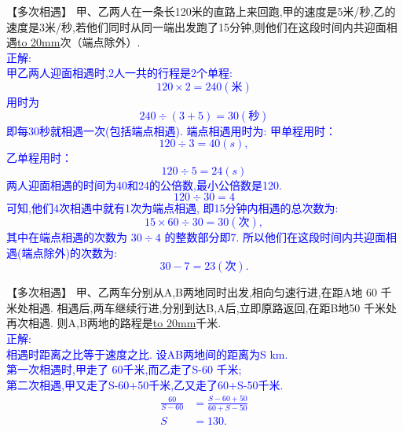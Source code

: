\item {
    【多次相遇】
    甲、乙两人在一条长120米的直路上来回跑,甲的速度是5米/秒,乙的速度是3米/秒,若他们同时从同一端出发跑了15分钟,则他们在这段时间内共迎面相遇\underline{\hbox to 20mm{}}次（端点除外）. 
    \ifshowSolution 
        \fangsong{}\textcolor{blue}{
            \\正解: \\
                甲乙两人迎面相遇时,2人一共的行程是2个单程:
                $$120\times 2=240(米)$$
                用时为
                $$240\div (3+5)=30(秒)$$
                即每30秒就相遇一次(包括端点相遇).
                端点相遇用时为:
                甲单程用时：
                 $$120\div 3 = 40 (s),$$
                乙单程用时：
                $$120\div 5=24 (s)$$
                两人迎面相遇的时间为40和24的公倍数,最小公倍数是120.
                $$120\div 30=4$$
                可知,他们4次相遇中就有1次为端点相遇,
                即15分钟内相遇的总次数为:
                 $$15\times 60\div 30 = 30(次),$$
                其中在端点相遇的次数为 $30\div 4$ 的整数部分即7.
                所以他们在这段时间内共迎面相遇(端点除外)的次数为:
                $$30-7=23(次).$$
        }
    \else
        \vspace{1cm}
    \fi
}

\item {
    【多次相遇】
    甲、乙两车分别从A,B两地同时出发,相向匀速行进,在距A地 60 千米处相遇. 相遇后,两车继续行进,分别到达B,A后,立即原路返回,在距B地50 千米处再次相遇. 则A,B两地的路程是\underline{\hbox to 20mm{}}千米. 
    \ifshowSolution 
        \fangsong{}\textcolor{blue}{
            \\正解: \\
            相遇时距离之比等于速度之比.
            设AB两地间的距离为S km.\\
            第一次相遇时,甲走了 60千米,而乙走了S-60 千米; \\
            第二次相遇,甲又走了S-60+50千米,乙又走了60+S-50千米.\\
            \begin{align*}
                \frac{60}{S-60} &= \frac{S-60+50}{60+S-50} \\
                S&=130.
            \end{align*}
        }
    \else
        \vspace{1cm}
    \fi
}

